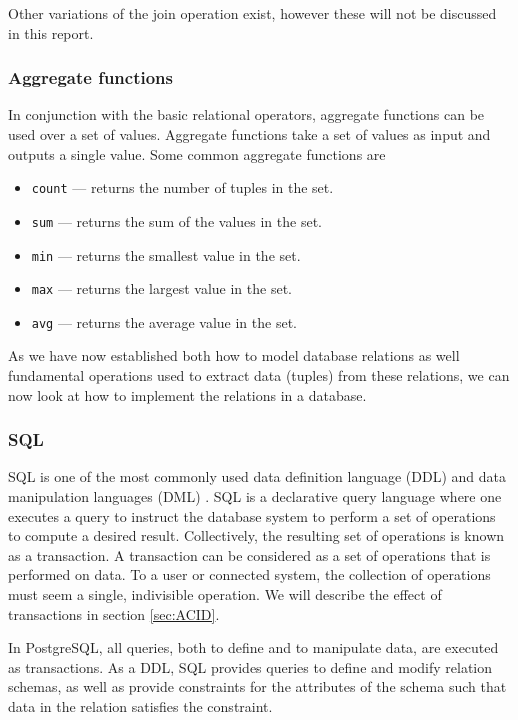 Other variations of the join operation exist\cite{DBSBook}, however these will not be discussed in this report.\\
\subsubsection*{Aggregate functions}
In conjunction with the basic relational operators, aggregate functions can be used over a set of values.
Aggregate functions take a set of values as input and outputs a single value\cite{DBSBook}. Some common aggregate functions are 
\begin{itemize} \label{aggregateFunctions}
    \item \texttt{count} --- returns the number of tuples in the set.
    \item \texttt{sum} --- returns the sum of the values in the set.
    \item \texttt{min} --- returns the smallest value in the set.
    \item \texttt{max} --- returns the largest value in the set.
    \item \texttt{avg} --- returns the average value in the set.
\end{itemize}


As we have now established both how to model database relations as well fundamental operations used to extract data (tuples) from these relations, we can now look at how to implement the relations in a database.

\subsubsection{SQL}\label{sec:SQL}
SQL is one of the most commonly used data definition language (DDL) and data manipulation languages (DML) \cite{DBSBook}.
SQL is a declarative query language where one executes a query to instruct the database system to perform a set of operations to compute a desired result.
Collectively, the resulting set of operations is known as a transaction.
A transaction can be considered as a set of operations that is performed on data.
To a user or connected system, the collection of operations must seem a single, indivisible operation\cite{DBSBook}.
We will describe the effect of transactions in section \ref{sec:ACID}.


In PostgreSQL, all queries, both to define and to manipulate data, are executed as transactions\cite{postgres_transactions}.
As a DDL, SQL provides queries to define and modify relation schemas, as well as provide constraints for the attributes of the schema such that data in the relation satisfies the constraint.  

